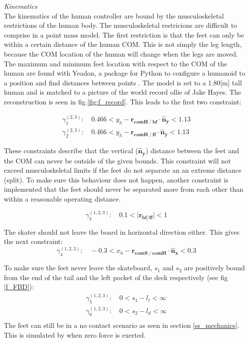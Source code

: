 \documentclass[default,iicol]{sn-jnl}
\theoremstyle{thmstyleone}%
\theoremstyle{thmstyletwo}%
\theoremstyle{thmstylethree}%
\begin{document}
\textit{Kinematics} \\
The kinematics of the human controller are bound by the musculoskeletal restrictions of the human body. The musculoskeletal restricions are difficult to comprise in a point mass model. The first restriction is that the feet can only be within a certain distance of the human COM. This is not simply the leg length, because the COM location of the human will change when the legs are moved. The maximum and minimum feet location with respect to the COM of the human are found with Yeadon, a package for Python to configure a humanoid to a position and find distances between points \cite{yeadon_simulation_1990}. The model is set to a 1.80[m] tall human and is matched to a picture of the world record ollie of Jake Hayes. The reconstruction is seen in fig.\ref{fig:f_record}. This leads to the first two constraint:


\begin{equation}\label{e_yeadon}
\begin{array}{c}
    \gamma_{1}^{(2,3)}:\quad  0.466 < y_h - \mathbf{r_{comH \mathbin{/} bf}} \cdot \mathbf{\hat n_y} < 1.13 \\ 
    \gamma_{2}^{(2,3)}:\quad  0.466 < y_h - \mathbf{r_{comH \mathbin{/} ff}} \cdot \mathbf{\hat n_y} < 1.13 
\end{array}
\end{equation}

These constraints describe that the vertical ($\mathbf{ \hat n_y}$) distance between the feet and the COM can never be outside of the given bounds. This constraint will not exceed musculoskeletal limits if the feet do not separate an an extreme distance (split). To make sure this behaviour does not happen, another constraint is implemented that the feet should never be separated more from each other than within a reasonable operating distance.

\begin{equation}
        \gamma_{3}^{(1,2,3)}:\quad   0.1 < \vert \mathbf{r_{bf/ff}} \vert < 1
\end{equation}

The skater should not leave the board in horizontal direction either. This gives the next constraint:
\begin{equation}
    \gamma_4^{(1,2,3)}:\quad  -0.3 < x_h - \mathbf{r_{comS\mathbin{/}comH}}\cdot \mathbf{\hat n_x} < 0.3
\end{equation}

To make sure the feet never leave the skateboard, $s_1$ and $s_2$ are positively bound from the end of the tail and the left pocket of the deck respectively (see fig \ref{f_FBD}):
\begin{equation}
\begin{array}{c}
    \gamma_{5}^{(1,2,3)}:\quad  0 < s_1-l_t < \infty  \\
    \gamma_{6}^{(1,2,3)}:\quad  0 < s_2-l_d < \infty  \\
\end{array}
\end{equation}
The feet can still be in a no contact scenario as seen in section \ref{ss_mechanics}. This is simulated by when zero force is exerted. 
\end{document}
